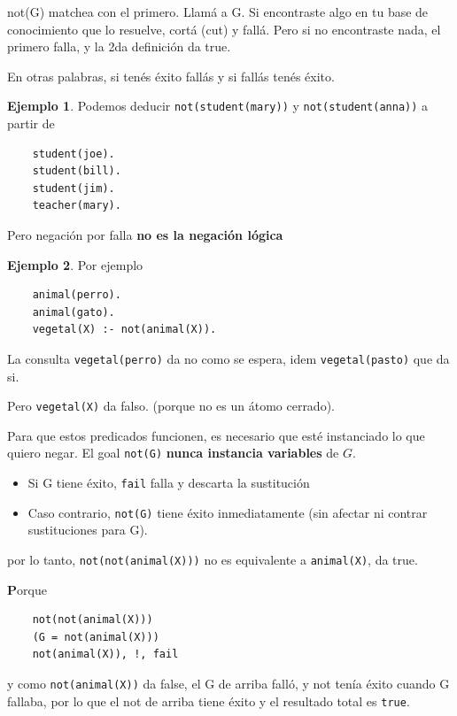 \documentclass{report}
\theoremstyle{definition} %
\newtheorem*{example*}{Ejemplo}
\newenvironment{nota}[1]
    {\begin{leftbar}\textbf{#1}}
    {\end{leftbar}}
\begin{document}
not(G) matchea con el primero. Llamá a G. Si encontraste algo en tu base de
conocimiento que lo resuelve, cortá (cut) y fallá. Pero si no encontraste nada,
el primero falla, y la 2da definición da true.

En otras palabras, si tenés éxito fallás y si fallás tenés éxito.

\begin{example*}
    Podemos deducir \texttt{not(student(mary))} y \texttt{not(student(anna))} a
    partir de
    \begin{verbatim}
    student(joe).
    student(bill).
    student(jim).
    teacher(mary).
    \end{verbatim}
\end{example*}

Pero negación por falla \textbf{no es la negación lógica}

\begin{example*} Por ejemplo
    \begin{verbatim}
    animal(perro).
    animal(gato).
    vegetal(X) :- not(animal(X)).
    \end{verbatim}

    La consulta \texttt{vegetal(perro)} da no como se espera, idem
    \texttt{vegetal(pasto)} que da si.
    
    Pero \texttt{vegetal(X)} da falso. (porque no es un átomo cerrado).
\end{example*}

Para que estos predicados funcionen, es necesario que esté instanciado lo que
quiero negar. El goal \texttt{not(G)} \textbf{nunca instancia variables} de $G$.

\begin{itemize}
    \item Si G tiene éxito, \texttt{fail} falla y descarta la sustitución
    \item Caso contrario, \texttt{not(G)} tiene éxito inmediatamente (sin
    afectar ni contrar sustituciones para G).
\end{itemize}

por lo tanto, \texttt{not(not(animal(X)))} no es equivalente a
\texttt{animal(X)}, da true.

\begin{nota}
    Porque
    \begin{verbatim}
    not(not(animal(X)))
    (G = not(animal(X)))
    not(animal(X)), !, fail
    \end{verbatim}
    y como \texttt{not(animal(X))} da false, el G de arriba falló, y not tenía
    éxito cuando G fallaba, por lo que el not de arriba tiene éxito y el
    resultado total es \texttt{true}.
\end{nota}
\end{document}

